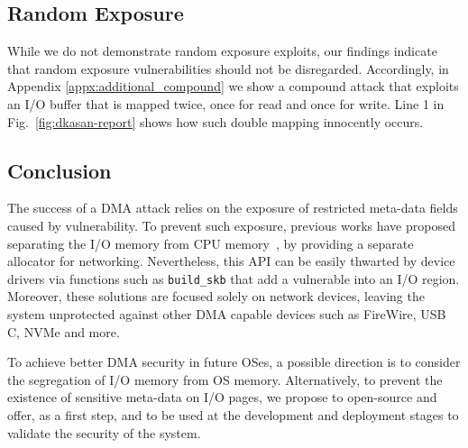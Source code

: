 \subsection{Random Exposure}\label{sec:rand_exp}
While we do not demonstrate random exposure exploits, our findings indicate that random exposure vulnerabilities should not be disregarded. Accordingly, in Appendix \ref{appx:additional_compound} we show a compound attack that exploits an I/O buffer that is mapped twice, once for read and once for write. Line 1 in Fig.~\ref{fig:dkasan-report}  shows how such double mapping innocently occurs.

\subsection{Conclusion}\label{sec:Conclusion}




The success of a DMA attack relies on the exposure of restricted meta-data fields caused by \subpage{} vulnerability. 
To prevent such exposure, previous works have proposed separating the I/O memory from CPU memory~\cite{MSMT18}, by providing a separate allocator for networking. 
Nevertheless, this API can be easily thwarted by device drivers via functions such as \texttt{build\_skb} that add a vulnerable \shinfo into an I/O region. 
Moreover, these solutions are focused solely on network devices, leaving the system unprotected against other DMA capable devices such as FireWire, USB C, NVMe and more.


To achieve better DMA security in future OSes, a possible direction is to consider the segregation of I/O memory from OS memory. 
Alternatively, to prevent the existence of sensitive meta-data on I/O pages, we propose to open-source and offer, as a first step, \tool{} and \dkasan{} to be used at the development and deployment stages to validate the security of the system. 



 


